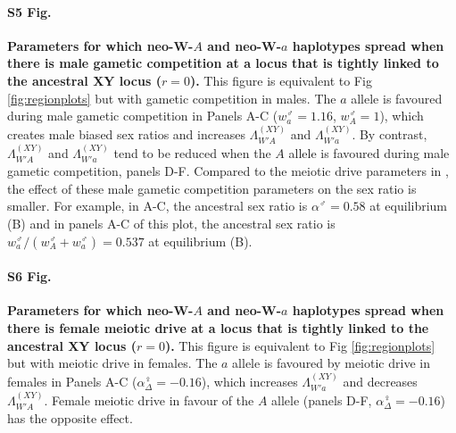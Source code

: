 \documentclass[10pt,letterpaper]{article}
\begin{document}
\paragraph*{S5 Fig.}
\label{fig:regionMaleGS}
{\bf Parameters for which neo-W-$A$ and neo-W-$a$ haplotypes spread when there is male gametic competition at a locus that is tightly linked to the ancestral XY locus ($r=0$).}
This figure is equivalent to Fig \ref{fig:regionplots} but with gametic competition in males.
The $a$ allele is favoured during male gametic competition in Panels A-C ($w_{a}^\male=1.16$, $w_{A}^\male=1$), which creates male biased sex ratios and increases $\Lambda_{W'A}^{(XY)}$ and $\Lambda_{W'a}^{(XY)}$. 
By contrast, $\Lambda_{W'A}^{(XY)}$ and $\Lambda_{W'a}^{(XY)}$ tend to be reduced when the $A$ allele is favoured during male gametic competition, panels D-F.
Compared to the meiotic drive parameters in , the effect of these male gametic competition parameters on the sex ratio is smaller. 
For example, in A-C, the ancestral sex ratio is $\alpha^\male=0.58$ at equilibrium (B) and in panels A-C of this plot, the ancestral sex ratio is $w_{a}^\male/(w_{A}^\male+w_{a}^\male)=0.537$ at equilibrium (B). 

\paragraph*{S6 Fig.}
\label{fig:regionFemaleDrive}
{\bf Parameters for which neo-W-$A$ and neo-W-$a$ haplotypes spread when there is female meiotic drive at a locus that is tightly linked to the ancestral XY locus ($r=0$).}
This figure is equivalent to Fig \ref{fig:regionplots} but with meiotic drive in females.
The $a$ allele is favoured by meiotic drive in females in Panels A-C ($\alpha_{\Delta}^\female=-0.16$), which increases $\Lambda_{W'a}^{(XY)}$ and decreases $\Lambda_{W'A}^{(XY)}$. 
Female meiotic drive in favour of the $A$ allele (panels D-F, $\alpha_{\Delta}^\female=-0.16$) has the opposite effect. 
\end{document}
